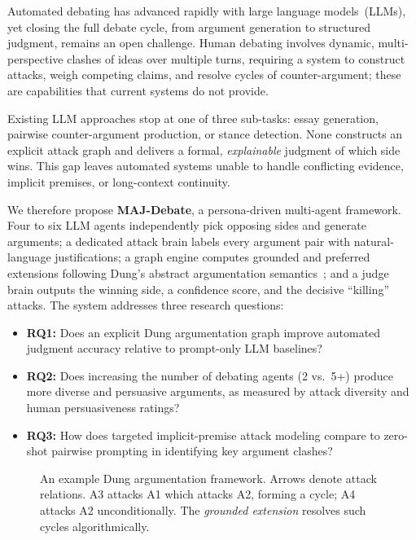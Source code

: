 \documentclass[11pt,twocolumn,letterpaper]{article}
\begin{document}
Automated debating has advanced rapidly with large language models~(LLMs),
yet closing the full debate cycle, from argument generation to structured
judgment, remains an open challenge. Human debating involves dynamic,
multi-perspective clashes of ideas over multiple turns, requiring a system
to construct attacks, weigh competing claims, and resolve cycles of
counter-argument; these are capabilities that current systems do not provide.

Existing LLM approaches stop at one of three sub-tasks: essay generation,
pairwise counter-argument production, or stance detection. None constructs
an explicit attack graph and delivers a formal, \textit{explainable} judgment
of which side wins. This gap leaves automated systems unable to handle
conflicting evidence, implicit premises, or long-context continuity.

We therefore propose \textbf{MAJ-Debate}, a persona-driven multi-agent
framework. Four to six LLM agents independently pick opposing sides and
generate arguments; a dedicated attack brain labels every argument pair
with natural-language justifications; a graph engine computes grounded and
preferred extensions following Dung's abstract argumentation
semantics~\citep{dung1995}; and a judge brain outputs the winning side,
a confidence score, and the decisive ``killing'' attacks. The system
addresses three research questions:

\begin{itemize}
  \item \textbf{RQ1:} Does an explicit Dung argumentation graph improve
        automated judgment accuracy relative to prompt-only LLM baselines?
  \item \textbf{RQ2:} Does increasing the number of debating agents (2
        vs.\ 5+) produce more diverse and persuasive arguments, as measured
        by attack diversity and human persuasiveness ratings?
  \item \textbf{RQ3:} How does targeted implicit-premise attack modeling
        compare to zero-shot pairwise prompting in identifying key argument
        clashes?
\end{itemize}

\begin{figure}[t]
\centering
{}
\caption{An example Dung argumentation framework. Arrows denote attack
relations. A3 attacks A1 which attacks A2, forming a cycle; A4 attacks
A2 unconditionally. The \textit{grounded extension} resolves such cycles
algorithmically.}
\label{fig:arg_graph}
\end{figure}
\end{document}
